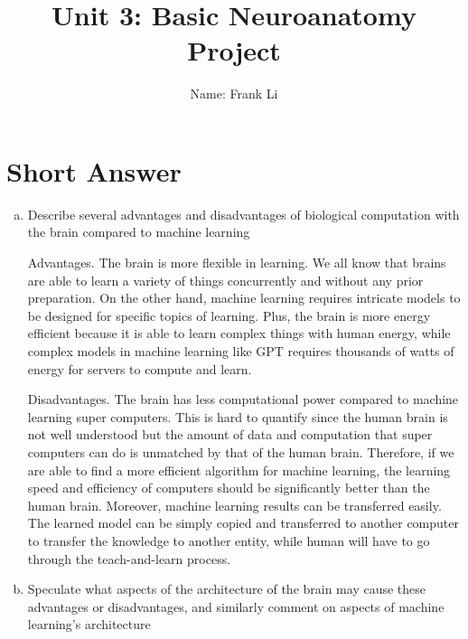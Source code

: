 \documentclass[letterpaper,11pt]{article}
\begin{document}
\title{{\bf Unit 3: Basic Neuroanatomy Project} }
\author{Name: Frank Li}

\date{}
\maketitle

\section*{Short Answer}
\begin{enumerate}[a)]
\item Describe several advantages and disadvantages of biological computation with the brain compared to machine learning

\begin{tcolorbox}
Advantages. The brain is more flexible in learning. We all know that brains are able to learn a variety of things concurrently and without any prior preparation. On the other hand, machine learning requires intricate models to be designed for specific topics of learning. Plus, the brain is more energy efficient because it is able to learn complex things with human energy, while complex models in machine learning like GPT requires thousands of watts of energy for servers to compute and learn.

Disadvantages. The brain has less computational power compared to machine learning super computers. This is hard to quantify since the human brain is not well understood but the amount of data and computation that super computers can do is unmatched by that of the human brain. Therefore, if we are able to find a more efficient algorithm for machine learning, the learning speed and efficiency of computers should be significantly better than the human brain. Moreover, machine learning results can be transferred easily. The learned model can be simply copied and transferred to another computer to transfer the knowledge to another entity, while human will have to go through the teach-and-learn process.
\end{tcolorbox}

\item Speculate what aspects of the architecture of the brain may cause these advantages or disadvantages, and similarly comment on aspects of machine learning’s architecture


\end{enumerate}
\end{document}
